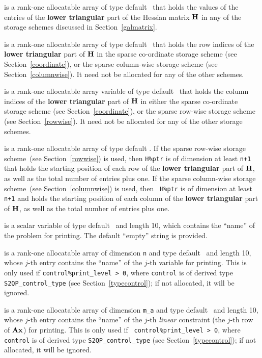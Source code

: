 \documentclass{galahad}
\newcommand{\packagename}{S2QP}
\begin{document}
\begin{description}
\begin{description}
 is a rank-one allocatable array of type default \realdp\ that holds
the values of the entries of the {\bf lower triangular} part
of the Hessian matrix ${\mathbf{H}}$ in any of the
storage schemes discussed in Section~\ref{galmatrix}.

 is a rank-one allocatable array of type default \integer\
that holds the row indices of the {\bf lower triangular} part of
${\mathbf{H}}$ in the sparse co-ordinate storage scheme (see
Section~\ref{coordinate}), or the sparse column-wise storage scheme
(see Section~\ref{columnwise}).  It need not be allocated for any of
the other schemes.

 is a rank-one allocatable array variable of type default \integer\
that holds the column indices of the {\bf lower triangular} part of
${\mathbf{H}}$ in either the sparse co-ordinate storage scheme
(see Section~\ref{coordinate}), or the sparse row-wise
storage scheme (see Section~\ref{rowwise}).
It need not be allocated for any of the other storage schemes.

 is a rank-one allocatable array of type default \integer.
If the sparse row-wise storage scheme~(see Section~\ref{rowwise}) is
used, then {\tt H\%ptr} is of dimension at least {\tt n+1} that holds the starting position
of each row of the {\bf lower triangular} part of ${\mathbf{H}}$, as well as
the total number of entries plus one.  If the sparse column-wise
storage scheme~(see Section~\ref{columnwise}) is used, then {\tt
  H\%ptr} is of dimension at least {\tt n+1} and holds the starting position of each column
of the {\bf lower triangular} part of ${\mathbf{H}}$, as well as the total
number of entries plus one.

\end{description}

 is a scalar variable of type
default \character\ and length 10, which contains the
``name'' of the problem for printing. The default ``empty'' string is
provided.

 is a rank-one allocatable array of dimension {\tt n} and type
default \character\ and length 10, whose $j$-th entry contains the
``name'' of the $j$-th variable for printing. This is only used
if {\tt control\%print\_level > 0}, where {\tt control} is of derived
type {\tt \packagename\_control\_type} (see
Section~\ref{typecontrol}); if not allocated, it will be ignored.

\itt{ANAMES} is a rank-one allocatable array of dimension {\tt m\_a}
and type default \character\ and length 10, whose $j$-th entry
contains the ``name'' of the $j$-th {\em linear} constraint (the
$j$-th row of ${\mathbf{A}}{\mathbf{x}}$) for printing.  This is only used if {\tt
  control\%print\_level > 0}, where {\tt control} is of derived type
{\tt \packagename\_control\_type} (see Section~\ref{typecontrol}); if
not allocated, it will be ignored.


\end{description}
\end{document}
